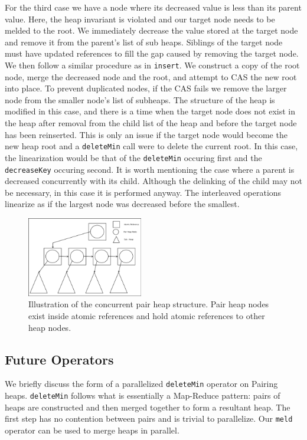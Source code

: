 \documentclass{acm_proc_article-sp}
\begin{document}
For the third case we have a node where its decreased value is less than its parent value.
Here, the heap invariant is violated and our target node needs to be melded to the root.
We immediately decrease the value stored at the target node and remove it from the parent's list
of sub heaps. Siblings of the target node must have updated references to fill the gap caused by removing the target node. 
We then follow a similar procedure as in \texttt{insert}. We construct a copy of the root
node, merge the decreased node and the root, and attempt to CAS the new root into place. To prevent duplicated
nodes, if the CAS fails we remove the larger node from the smaller node's list of subheaps. The structure of the heap is modified in this case, and there is a time when the target node does not exist in the heap after removal from the child list of the heap and before the target node has been reinserted. This is only an issue if the target node would become the new heap root and a \texttt{deleteMin} call were to delete the current root. In this case, the linearization would be that of the \texttt{deleteMin} occuring first and the \texttt{decreaseKey} occuring second. 
It is worth mentioning the case where a parent is decreased concurrently with its child. Although the
delinking of the child may not be necessary, in this case it is performed anyway. The
interleaved operations linearize as if the largest node was decreased before the smallest. 

\begin{figure}
  \includegraphics[width=0.45\textwidth]{img/PairHeapConcurrent-crop.pdf}
  \caption{Illustration of the concurrent pair heap structure. Pair heap nodes exist inside atomic references and hold atomic references to other heap nodes.}
  \label{fig:pairheap:structure}
\end{figure}

\subsection{Future Operators}
We briefly discuss the form of a parallelized \texttt{deleteMin} operator on Pairing heaps.
\texttt{deleteMin} follows what is essentially a Map-Reduce pattern: pairs of heaps are constructed
and then merged together to form a resultant heap. The first step has no contention between pairs
and is trivial to parallelize. Our \texttt{meld} operator can be used to merge heaps in parallel.
\end{document}

